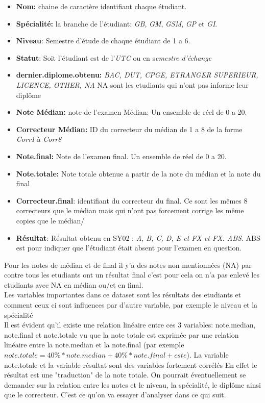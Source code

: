 \documentclass[]{report}
\begin{document}
\begin{itemize}
	\item \textbf{Nom:} chaine de caractère identifiant chaque étudiant.
	\item \textbf{Spécialité:} la branche de l'étudiant: \textit{GB}, \textit{GM}, \textit{GSM}, \textit{GP} et \textit{GI}.
	\item \textbf{Niveau}: Semestre d'étude de chaque étudiant de 1 a 6.
	\item \textbf{Statut}: Soit l'étudiant est de l'\textit{UTC} ou en s\textit{emestre d'échange}
	\item \textbf{dernier.diplome.obtenu:}
	\textit{BAC, DUT, CPGE, ETRANGER SUPERIEUR, LICENCE, OTHER, NA} NA sont les etudiants qui n'ont pas informe leur diplôme 
	\item \textbf{Note Médian:} note de l'examen Médian: Un ensemble de réel de 0 a 20.
	\item \textbf{Correcteur Médian:} ID du correcteur du médian de 1 a 8 de la forme \textit{Corr1} à \textit{Corr8}
	\item \textbf{Note.final:} Note de l'examen final.  Un ensemble de réel de 0 a 20.
	\item \textbf{Note.totale:} Note totale obtenue a partir de la note du médian et la note du final
	\item \textbf{Correcteur.final}: identifiant  du correcteur du final. Ce sont les mêmes 8 correcteurs que le médian mais qui n'ont pas forcement corrige les même copies que le médian/
	\item \textbf{Résultat}: Résultat obtenu en SY02 : \textit{A, B, C, D, E et FX et FX. ABS}. ABS est pour indiquer que l'étudiant était absent pour l'examen en question.
\end{itemize}

Pour les notes de médian et de final il y'a des notes non mentionnées (NA) par contre tous les etudiants ont un résultat final c'est pour cela on n'a pas enlevé les etudiants avec NA en médian ou/et en final.\\
Les variables importantes dans ce dataset sont les résultats des etudiants et comment ceux ci sont influences par d'autre variable, par exemple le niveau et la spécialité\\
Il est évident qu'il existe une relation linéaire entre ces 3 variables: note.median, note.final et note.totale vu que la note totale est exprimée par une relation linéaire entre la note.median et la note.final (par exemple $note.totale = 40\% * note.median + 40\% * note.final + cste$). La variable note.totale et la variable résultat sont des variables fortement corrélés En effet le résultat est une "traduction"  de la note totale. On pourrait éventuellement se demander sur la relation entre les notes et le niveau, la spécialité, le diplôme ainsi que le correcteur. C'est ce qu'on va essayer d'analyser dans ce qui suit. 
\end{document}
